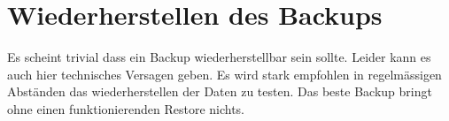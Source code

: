 

\section{Wiederherstellen des Backups}
Es scheint trivial dass ein Backup wiederherstellbar sein sollte.
Leider kann es auch hier technisches Versagen geben.
Es wird stark empfohlen in regelmässigen Abständen das wiederherstellen der Daten zu testen.
Das beste Backup bringt ohne einen funktionierenden Restore nichts.